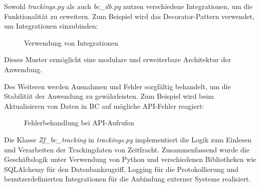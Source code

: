 Sowohl \textit{trackings.py} als auch \textit{bc\_db.py} nutzen verschiedene Integrationen, um die Funktionalität zu erweitern. 
Zum Beispiel wird das Decorator-Pattern verwendet, um Integrationen einzubinden:

\begin{figure}[htb]
    \centering
    \caption{Verwendung von Integrationen}
    \label{fig:Integrationen}
\end{figure}


Dieses Muster ermöglicht eine modulare und erweiterbare Architektur der Anwendung.



Des Weiteren werden Ausnahmen und Fehler sorgfältig behandelt, um die Stabilität der Anwendung zu gewährleisten. 
Zum Beispiel wird beim Aktualisieren von Daten in BC auf mögliche API-Fehler reagiert:

\begin{figure}[htb]
    \centering
    \caption{Fehlerbehandlung bei API-Aufrufen}
    \label{fig:viewAPI}
\end{figure}

Die Klasse \textit{Zf\_bc\_tracking} in \textit{trackings.py} implementiert die Logik zum Einlesen und Verarbeiten der Trackingdaten 
von Zeitfracht. Zusammenfassend wurde die Geschäftslogik unter Verwendung von Python und verschiedenen Bibliotheken wie SQLAlchemy 
für den Datenbankzugriff, Logging für die Protokollierung und benutzerdefinierten Integrationen für die Anbindung externer Systeme realisiert.


























